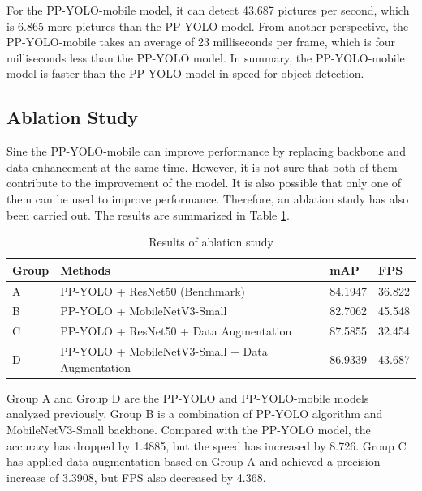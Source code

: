 \documentclass[sensors,article,submit,moreauthors,pdftex]{Definitions/mdpi}
\begin{document}
\begin{paracol}{2}
\linenumbers
\switchcolumn



For the PP-YOLO-mobile model, it can detect 43.687 pictures per second, which is 6.865 more pictures than the PP-YOLO model. From another perspective, the PP-YOLO-mobile takes an average of 23 milliseconds per frame, which is four milliseconds less than the PP-YOLO model. In summary, the PP-YOLO-mobile model is faster than the PP-YOLO model in speed for object detection.



\subsection{Ablation Study}

Sine the PP-YOLO-mobile can improve performance by replacing backbone and data enhancement at the same time. However, it is not sure that both of them contribute to the improvement of the model. It is also possible that only one of them can be used to improve performance. Therefore, an ablation study has also been carried out. The results are summarized in Table \ref{tbl:Results of ablation study}.


\begin{table}[htbp]
\centering
\caption{Results of ablation study}
\begin{tabular}{llll} 
\toprule
\textbf{Group}&\textbf{Methods}&\textbf{mAP}&\textbf{FPS}\\
\midrule
A& PP-YOLO + ResNet50 (Benchmark) &84.1947 & 36.822\\
\cmidrule(r){1-4}
B& PP-YOLO + MobileNetV3-Small &82.7062 & 45.548\\
C& PP-YOLO + ResNet50 + Data Augmentation & 87.5855 & 32.454\\
D& PP-YOLO + MobileNetV3-Small + Data Augmentation & 86.9339& 43.687\\
\bottomrule
\end{tabular}
\label{tbl:Results of ablation study}
\end{table}

Group A and Group D are the PP-YOLO and PP-YOLO-mobile models analyzed previously. Group B is a combination of PP-YOLO algorithm and MobileNetV3-Small backbone. Compared with the PP-YOLO model, the accuracy has dropped by 1.4885, but the speed has increased by 8.726. Group C has applied data augmentation based on Group A and achieved a precision increase of 3.3908, but FPS also decreased by 4.368.


\end{paracol}
\end{document}
